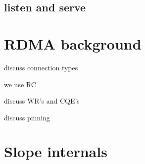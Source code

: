 \subsection{listen and serve}


\section{RDMA background}

discuss connection types

we use RC

discuss WR's and CQE's

discuss pinning

\section{Slope internals}

